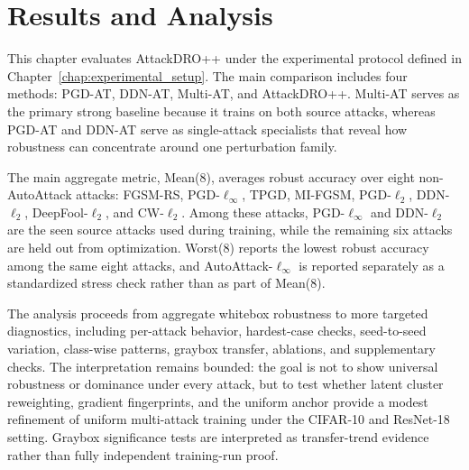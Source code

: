 ﻿
\chapter{Results and Analysis}
\label{chap:results_analysis}
This chapter evaluates AttackDRO++ under the experimental protocol defined in
Chapter~\ref{chap:experimental_setup}. The main comparison includes four
methods: PGD-AT, DDN-AT, Multi-AT, and AttackDRO++. Multi-AT serves as the
primary strong baseline because it trains on both source attacks, whereas PGD-AT
and DDN-AT serve as single-attack specialists that reveal how robustness can
concentrate around one perturbation family.

The main aggregate metric, Mean(8), averages robust accuracy over eight
non-AutoAttack attacks: FGSM-RS, PGD-\(\ell_\infty\), TPGD, MI-FGSM,
PGD-\(\ell_2\), DDN-\(\ell_2\), DeepFool-\(\ell_2\), and CW-\(\ell_2\).
Among these attacks, PGD-\(\ell_\infty\) and DDN-\(\ell_2\) are the seen source
attacks used during training, while the remaining six attacks are held out from
optimization. Worst(8) reports the lowest robust accuracy among the same eight
attacks, and AutoAttack-\(\ell_\infty\) is reported separately as a standardized
stress check rather than as part of Mean(8).

The analysis proceeds from aggregate whitebox robustness to more targeted
diagnostics, including per-attack behavior, hardest-case checks, seed-to-seed
variation, class-wise patterns, graybox transfer, ablations, and supplementary
checks. The interpretation remains bounded: the goal is not to show universal
robustness or dominance under every attack, but to test whether latent cluster
reweighting, gradient fingerprints, and the uniform anchor provide a modest
refinement of uniform multi-attack training under the CIFAR-10 and ResNet-18
setting. Graybox significance tests are interpreted as transfer-trend evidence
rather than fully independent training-run proof.





% 




